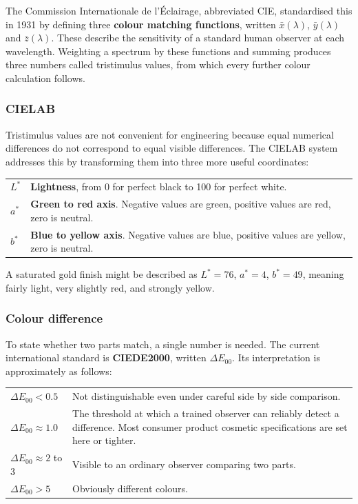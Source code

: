 \documentclass[11pt,a4paper]{article}
\newcommand{\dE}{\ensuremath{\Delta E_{00}}}
\begin{document}
The Commission Internationale de l'\'Eclairage, abbreviated CIE, standardised
this in 1931 by defining three \textbf{colour matching functions}, written
$\bar{x}(\lambda)$, $\bar{y}(\lambda)$ and $\bar{z}(\lambda)$. These describe
the sensitivity of a standard human observer at each wavelength. Weighting a
spectrum by these functions and summing produces three numbers called
tristimulus values, from which every further colour calculation follows.

\subsubsection{CIELAB}

Tristimulus values are not convenient for engineering because equal numerical
differences do not correspond to equal visible differences. The CIELAB system
addresses this by transforming them into three more useful coordinates:

\begin{defbox}
\begin{tabular}{@{}p{2.2cm}p{11.6cm}@{}}
$L^*$ & \textbf{Lightness}, from 0 for perfect black to 100 for perfect white. \\[3pt]
$a^*$ & \textbf{Green to red axis}. Negative values are green, positive values
        are red, zero is neutral. \\[3pt]
$b^*$ & \textbf{Blue to yellow axis}. Negative values are blue, positive values
        are yellow, zero is neutral. \\
\end{tabular}
\end{defbox}

A saturated gold finish might be described as $L^* = 76$, $a^* = 4$, $b^* = 49$,
meaning fairly light, very slightly red, and strongly yellow.

\subsubsection{Colour difference}

To state whether two parts match, a single number is needed. The current
international standard is \textbf{CIEDE2000}, written \dE. Its interpretation
is approximately as follows:

\begin{defbox}
\begin{tabular}{@{}p{3.0cm}p{10.8cm}@{}}
$\dE < 0.5$   & Not distinguishable even under careful side by side comparison. \\[2pt]
$\dE \approx 1.0$ & The threshold at which a trained observer can reliably
                    detect a difference. Most consumer product cosmetic
                    specifications are set here or tighter. \\[2pt]
$\dE \approx 2$ to $3$ & Visible to an ordinary observer comparing two parts. \\[2pt]
$\dE > 5$     & Obviously different colours. \\
\end{tabular}
\end{defbox}
\end{document}
